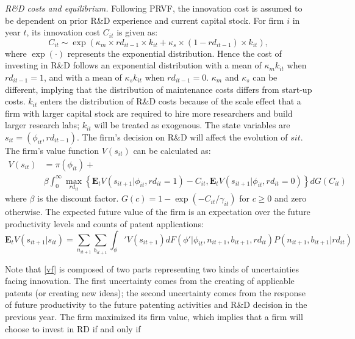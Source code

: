 \documentclass[English]{article}
\begin{document}
\textit{R\&D costs and equilibrium.} Following PRVF, the innovation cost is assumed to be dependent on prior R\&D experience and current capital stock. For firm $i$ in year $t$, its innovation cost $C_{it}$ is given as:
\begin{equation}
    C_{it}\sim \exp(\kappa_m\times rd_{it-1}\times k_{it}+\kappa_{s}\times(1-rd_{it-1})\times k_{it}),
\end{equation}
where $\exp(\cdot)$ represents the exponential distribution. Hence the cost of investing in R\&D follows an exponential distribution with a mean of $\kappa_mk_{it}$ when $rd_{it-1}=1$, and with a mean of $\kappa_sk_{it}$ when $rd_{it-1}=0$. $\kappa_m$ and $\kappa_s$ can be different, implying that the distribution of
maintenance costs differs from start-up costs. $k_{it}$ enters the distribution of R\&D costs because of the scale effect that a firm with larger capital stock are required to hire more researchers and build larger research labs; $k_{it}$ will be treated as exogenous. The state variables are $s_{it} = (\phi_{it} ,rd_{it-1})$. The firm's decision on R\&D will affect the evolution of $s {it}$. The firm's value function $V(s_{it})$ can be calculated as:
\begin{align}
    V(s_{it}) &= \pi(\phi_{it}) + \\
              &\beta \int _0^{\infty}\max_{rd_{it}}\left\{\mathbf{E}_t V(s_{it+1}|\phi_{it},rd_{it}=1)-C_{it}, \mathbf{E}_tV(s_{it+1}|\phi_{it}, rd_{it}=0)\right\}dG(C_{it}) \nonumber
\end{align}
where $\beta$ is the discount factor. $G(c)=1-\exp(-C_{it}/\gamma_{it})$ for $c\geq0$ and zero otherwise. The expected future value of the firm is an expectation over the future productivity levels and counts of patent applications:
\begin{equation}\label{vf}
    \mathbf{E}_tV(s_{it+1}|s_{it}) = \sum_{n_{it+1}}\sum_{b_{it+1}}\int_\phi' V(s_{it+1})dF(\phi'|\phi_{it}, n_{it+1}, b_{it+1}, rd_{it}) P(n_{it+1}, b_{it+1}|rd_{it})
\end{equation}

Note that \ref{vf} is composed of two parts representing two kinds of uncertainties facing innovation. The first uncertainty comes from the creating of applicable patents (or creating new ideas); the second uncertainty comes from the response of future productivity to the future patenting activities and R\&D decision in the previous year. The firm maximized its firm value, which implies that a firm will choose to invest in RD if and only if
\end{document}
